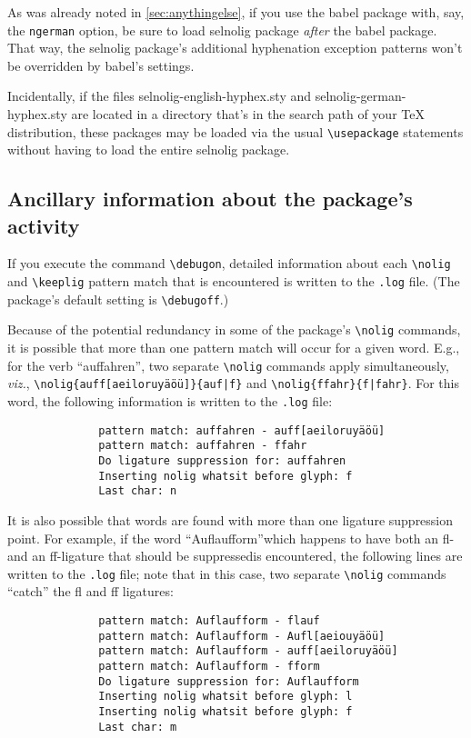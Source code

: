 \documentclass[11pt]{article}
\newcommand{\pkg}[1]{\textsf{#1}}
\newcommand{\opt}[1]{\texttt{#1}}
\newcommand{\cmmd}[1]{\texttt{\textbackslash #1}}
\begin{document}
As was already noted in \cref{sec:anythingelse}, if you use the \pkg{babel} package with, say, the \opt{ngerman} option, be sure to load \pkg{selnolig} package \emph{after} the \pkg{babel} package. That way, the \pkg{selnolig} package's additional hyphenation exception patterns won't be overridden by \pkg{babel}'s settings.

Incidentally, if the files \pkg{selnolig-english-hyphex.sty} and \pkg{selnolig-german-hyphex.sty} are located in a directory that's in the search path of your TeX distribution, these packages may be loaded via the usual \cmmd{usepackage} statements without having to load the entire \pkg{selnolig} package.



\subsection{Ancillary information about the package's activity} \label{sec:debugon}

If you execute the command \cmmd{debugon}, detailed information about each \cmmd{nolig} and \cmmd{keeplig} pattern match that is encountered is written to the \opt{.log} file. (The package's default setting is \cmmd{debugoff}.)

Because of the potential redundancy in some of the package's \cmmd{nolig} commands, it is possible that more than one pattern match will occur for a given word. E.g., for the verb \enquote{auffahren}, two separate \cmmd{nolig} commands apply simultaneously, \emph{viz.}, \Verb+\nolig{auff[aeiloruyäöü]}{auf|f}+ and \Verb+\nolig{ffahr}{f|fahr}+. For this word, the following information is written to the \opt{.log} file:
\begin{Verbatim}
              pattern match: auffahren - auff[aeiloruyäöü]
              pattern match: auffahren - ffahr
              Do ligature suppression for: auffahren
              Inserting nolig whatsit before glyph: f
              Last char: n
\end{Verbatim}

It is also possible that words are found with more than one ligature suppression point. For example, if the word \enquote{Auflaufform}\textemdash which happens to have both an fl- and an ff-ligature that should be suppressed\textemdash is encountered, the following lines are written to the \opt{.log} file; note that in this case, two separate \cmmd{nolig} commands \enquote{catch} the fl and ff ligatures:
\begin{Verbatim}
              pattern match: Auflaufform - flauf
              pattern match: Auflaufform - Aufl[aeiouyäöü]
              pattern match: Auflaufform - auff[aeiloruyäöü]
              pattern match: Auflaufform - fform
              Do ligature suppression for: Auflaufform
              Inserting nolig whatsit before glyph: l
              Inserting nolig whatsit before glyph: f
              Last char: m
\end{Verbatim}
\end{document}
